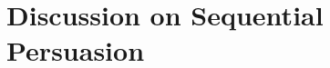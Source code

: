 \documentclass[12pt,journal,onecolumn]{IEEEtran}
\newtheorem{prop}{{Proposition}}
\newenvironment{Proof}[1]{\medskip\par\noindent{\bf Proof:\,}\,#1}{{\mbox{\,$\blacksquare$}\par}}
\begin{document}
\section{Discussion on Sequential Persuasion}\label{Sect:Discussion}%
\end{document}
